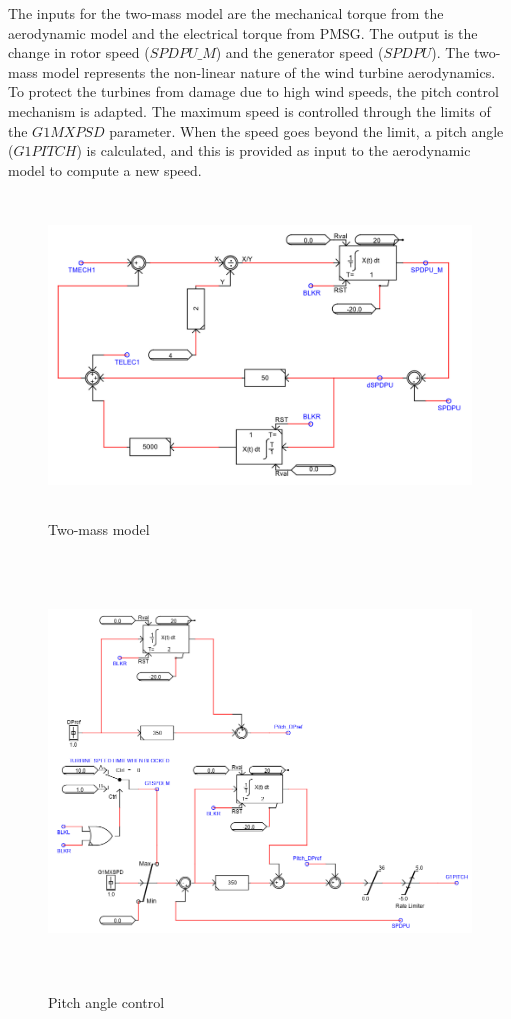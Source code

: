 The inputs for the two-mass model are the mechanical torque from the aerodynamic model and the electrical torque from \gls{PMSG}. The output is the change in rotor speed ($SPDPU\_M$) and the generator speed ($SPDPU$). The two-mass model represents the non-linear nature of the wind turbine aerodynamics. To protect the turbines from damage due to high wind speeds, the pitch control mechanism is adapted. The maximum speed is controlled through the limits of the $G1MXPSD$ parameter. When the speed goes beyond the limit, a pitch angle ($G1PITCH$) is calculated, and this is provided as input to the aerodynamic model to compute a new speed.  

\begin{figure}[H]
\centering
    \includegraphics[height = 8.5cm,width = 12.5cm]{Diagrams/Appendix_A/Two_mass_model.PNG}
    \caption{Two-mass model}
    \label{fig:Two-mass model}
\end{figure}

\begin{figure}[H]
\centering
    \includegraphics[height = 11.5cm,width = 14.5cm]{Diagrams/Appendix_A/Pitch_controller.PNG}
    \caption{Pitch angle control}
    \label{fig:Pitch_controller}
\end{figure}

